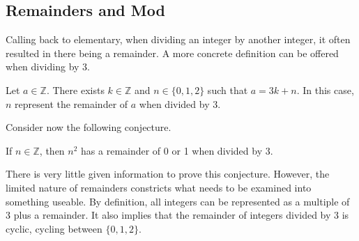 \documentclass[../notes.tex]{subfiles}
\begin{document}

\subsection{Remainders and Mod}

Calling back to elementary, when dividing an integer by another integer, it often resulted in there being a remainder. A more concrete definition can be offered when dividing by 3.

\begin{definition}
	Let $a \in\mathbb{Z}$. There exists $k\in\mathbb{Z}$ and $n \in \{0,1,2\}$ such that $a=3k + n$. In this case, $n$ represent the remainder of $a$ when divided by 3.
\end{definition}

Consider now the following conjecture.

\begin{conjecture}
	If $n \in \mathbb{Z}$, then $n^2$ has a remainder of 0 or 1 when divided by 3.
\end{conjecture}

There is very little given information to prove this conjecture. However, the limited nature of remainders constricts what needs to be examined into something useable. By definition, all integers can be represented as a multiple of 3 plus a remainder. It also implies that the remainder of integers divided by 3 is cyclic, cycling between $\{0,1,2\}$.

\end{document}
